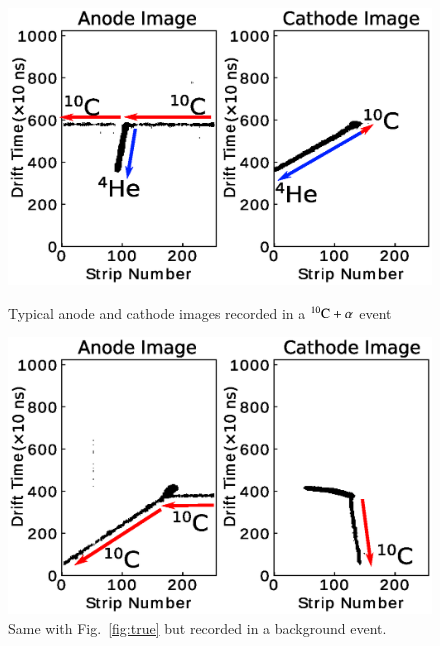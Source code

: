 \documentclass{jps-cp}
\begin{document}
\begin{figure}
  \centering
  \begin{minipage}{0.45\columnwidth}
    \centering
    \includegraphics[clip, width=0.9\columnwidth]{eps/true.eps}
    \caption{Typical anode and cathode images recorded in a ${}^{10}\rm{C}+\alpha$ event}
    \label{fig:true}
  \end{minipage}
  \hfill
  \begin{minipage}{0.45\columnwidth}
    \centering
    \includegraphics[clip, width=0.9\columnwidth]{eps/false.eps}
    \caption{Same with Fig.~\ref{fig:true} but recorded in a background event.}
    \label{fig:false}
  \end{minipage}
\end{figure}
\end{document}
